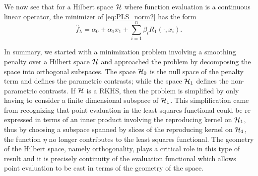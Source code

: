 We now see that for a Hilbert space $\mathcal{H}$ where function evaluation is a continuous linear operator, the minimizer of \eqref{eq:PLS_norm2} has the form 
\begin{equation}
\widehat{f}_{\lambda} = \alpha_0 + \alpha_1x_1 + \sum_{i=1}^n \beta_iR_1(\cdot, x_i).
\label{eq:solution_form}
\end{equation}

In summary, we started with a minimization problem involving a smoothing penalty over a Hilbert space $\mathcal{H}$ and approached the problem by decomposing the space into orthogonal subspaces. The space $\mathcal{H}_0$ is the null space of the penalty term and defines the parametric contrasts; while the space $\mathcal{H}_1$ defines the non-parametric contrasts. If $\mathcal{H}$ is a RKHS, then the problem is simplified by only having to consider a finite dimensional subspace of $\mathcal{H}_1$. This simplification came from recognizing that point evaluation in the least squares functional could be re-expressed in terms of an inner product involving the reproducing kernel on $\mathcal{H}_1$, thus by choosing a subspace spanned by slices of the reproducing kernel on $\mathcal{H}_1$, the function $\eta$ no longer contributes to the least squares functional. The geometry of the Hilbert space, namely orthogonality, plays a critical role in this type of result and it is precisely continuity of the evaluation functional which allows point evaluation to be cast in terms of the geometry of the space.
%
%
%
%
%
%
